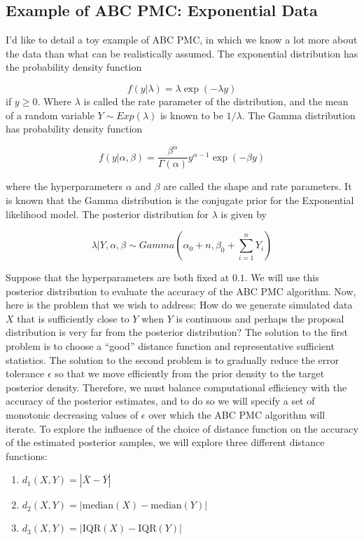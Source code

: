 \documentclass[12pt]{article}
\begin{document}
\subsection{Example of ABC PMC: Exponential Data}

I'd like to detail a toy example of ABC PMC, in which we know a lot more about the data than what can be realistically assumed. The exponential distribution has the probability density function

$$ f(y | \lambda) = \lambda \exp( -\lambda y)$$ if $y \geq 0$. Where $\lambda$ is called the rate parameter of the distribution, and the mean of a random variable $Y \sim Exp(\lambda)$ is known to be $1 / \lambda$. The Gamma distribution has probability density function 

$$ f(y | \alpha, \beta) = \frac{\beta^\alpha}{ \Gamma(\alpha)} y ^{\alpha-1} \exp(-\beta y)$$

where the hyperparameters $\alpha$ and $\beta$ are called the shape and rate parameters. It is known that the Gamma distribution is the conjugate prior for the Exponential likelihood model. The posterior distribution for $\lambda$ is given by 

$$ \lambda | Y , \alpha, \beta \sim Gamma( \alpha_0 + n , \beta_0 + \sum_{i=1}^n Y_i)$$
 
Suppose that the hyperparameters are both fixed at $0.1$. We will use this posterior distribution to evaluate the accuracy of the ABC PMC algorithm. Now, here is the problem that we wish to address: How do we generate simulated data $X$ that is sufficiently close to $Y$ when $Y$ is continuous and perhaps the proposal distribution is very far from the posterior distribution? The solution to the first problem is to choose a ``good'' distance function and representative sufficient statistics. The solution to the second problem is to gradually reduce the error tolerance $\epsilon$ so that we move efficiently from the prior density to the target posterior density. Therefore, we must balance computational efficiency with the accuracy of the posterior estimates, and to do so we will specify a set of monotonic decreasing values of $\epsilon$ over which the ABC PMC algorithm will iterate. To explore the influence of the choice of distance function on the accuracy of the estimated posterior samples, we will explore three different distance functions:

\begin{enumerate}
\item $d_1 (X,Y) = | \bar{X} - \bar{Y} |$
\item $d_2 ( X, Y) = |\textrm{median}(X) - \textrm{median}(Y)|$
\item $d_3(X,Y) = |\textrm{IQR}(X) - \textrm{IQR}(Y)|$

\end{enumerate}
\end{document}
